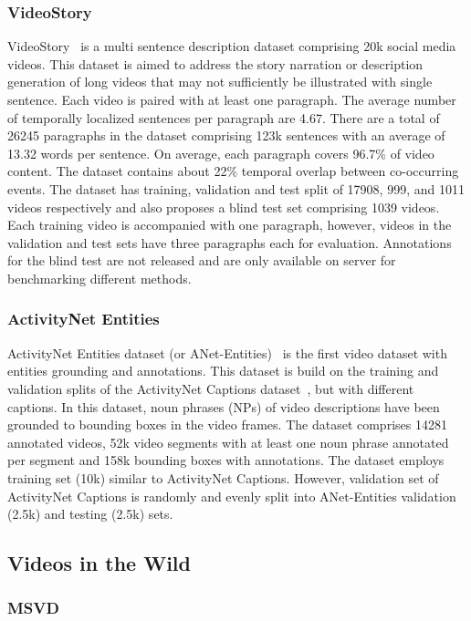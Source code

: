 \documentclass[10pt,journal,compsoc]{IEEEtran}
\begin{document}
\subsubsection{VideoStory}
\label{subsec:videostory}
VideoStory~\cite{gella2018dataset} is a multi sentence description dataset comprising 20k social media videos. This dataset is aimed to address the story narration or description generation of long videos that may not sufficiently be illustrated with single sentence. Each video is paired with at least one paragraph. The average number of temporally localized sentences per paragraph are 4.67. There are a total of 26245 paragraphs in the dataset comprising 123k sentences with an average of 13.32 words per sentence. On average, each paragraph covers 96.7\% of video content. The dataset contains about 22\% temporal overlap between co-occurring events. The dataset has training, validation and test split of 17908, 999, and 1011 videos respectively and also proposes a blind test set comprising 1039 videos. Each training video is accompanied with one paragraph, however, videos in the validation and test sets have three paragraphs each for evaluation. Annotations for the blind test are not released and are only available on server for benchmarking different methods.

\subsubsection{ActivityNet Entities}
\label{subsec:activitynetenteties}
ActivityNet Entities dataset (or ANet-Entities)~\cite{zhou2018grounded} is the first video dataset with entities grounding and annotations. This dataset is build on the training and validation splits of the ActivityNet Captions dataset~\cite{krishna2017dense}, but with different captions. In this dataset, noun phrases (NPs) of video descriptions have been grounded to bounding boxes in the video frames. The dataset comprises 14281 annotated videos, 52k video segments with at least one noun phrase annotated per segment and 158k bounding boxes with annotations. The dataset employs training set (10k) similar to ActivityNet Captions. However, validation set of ActivityNet Captions is randomly and evenly split into ANet-Entities validation (2.5k) and testing (2.5k) sets.


\subsection{Videos in the Wild}
\label{sec:datasets_general}
\subsubsection{MSVD}
\end{document}
